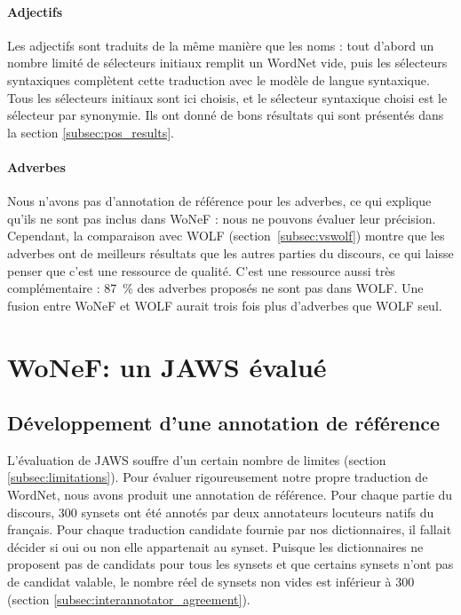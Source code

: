 \paragraph{Adjectifs} Les adjectifs sont traduits de la même manière que les
noms : tout d'abord un nombre limité de sélecteurs initiaux remplit un WordNet
vide, puis les sélecteurs syntaxiques complètent cette traduction avec le
modèle de langue syntaxique. Tous les sélecteurs initiaux sont ici choisis, et
le sélecteur syntaxique choisi est le sélecteur par synonymie. Ils ont donné de
bons résultats qui sont présentés dans la section \ref{subsec:pos_results}.

\paragraph{Adverbes}

Nous n'avons pas d'annotation de référence pour les adverbes, ce qui explique
qu'ils ne sont pas inclus dans WoNeF : nous ne pouvons évaluer leur précision.
Cependant, la comparaison avec WOLF (section~\ref{subsec:vswolf}) montre que
les adverbes ont de meilleurs résultats que les autres parties du discours, ce
qui laisse penser que c'est une ressource de qualité. C'est une ressource aussi
très complémentaire : 87~\% des adverbes proposés ne sont pas dans WOLF. Une
fusion entre WoNeF et WOLF aurait trois fois plus d'adverbes que WOLF seul.

\section{WoNeF: un JAWS évalué}
\label{sec:evaluating_jaws}

\subsection{Développement d'une annotation de référence}
\label{subsec:gold_standard}

L'évaluation de JAWS souffre d'un certain nombre de limites (section
\ref{subsec:limitations}). Pour évaluer rigoureusement notre propre traduction
de WordNet, nous avons produit une annotation de référence. Pour chaque partie
du discours, 300 synsets ont été annotés par deux annotateurs locuteurs natifs
du français. Pour chaque traduction candidate fournie par nos dictionnaires, il
fallait décider si oui ou non elle appartenait au synset. Puisque les
dictionnaires ne proposent pas de candidats pour tous les synsets et que
certains synsets n'ont pas de candidat valable, le nombre réel de synsets non
vides est inférieur à 300 (section \ref{subsec:interannotator_agreement}).

